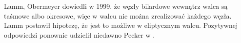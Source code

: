 Lamm, Obermeyer dowiedli w 1999, że węzły bilardowe wewnątrz walca są taśmowe albo okresowe, więc w walcu nie można zrealizować każdego węzła.
Lamm postawił hipotezę, że jest to możliwe w eliptycznym walcu.
Pozytywnej odpowiedzi ponownie udzielił niedawno Pecker w \cite{pecker12}.

